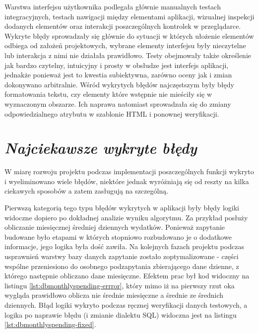 \documentclass[a4paper, 10pt, twoside, openright]{report}
\newcommand{\customstylesection}[1]{\textbf{\textit{#1}}}
\begin{document}
\begin{large}
\medskip
{Warstwa interfejsu użytkownika podlegała głównie manualnych testach 
integracyjnych, testach nawigacji między elementami aplikacji, wizualnej 
inspekcji dodanych elementów oraz interakcji poszczególnych kontrolek w 
przeglądarce. Wykryte błędy sprowadzały się głównie do sytuacji w których 
ułożenie elementów odbiega od założeń projektowych, wybrane elementy 
interfejsu były nieczytelne lub interakcja z nimi nie działała prawidłowo. Testy
 obejmowały także określenie jak bardzo czytelny, intuicyjny i prosty w obsłudze
 jest interfejs aplikacji, jednakże ponieważ jest to kwestia subiektywna, 
zarówno oceny jak i zmian dokonywano arbitralnie. Wśród wykrytych błędów 
najczęstszym były błędy formatowania tekstu, czy elementy które wstępnie nie 
mieściły się w wyznaczonym obszarze. Ich naprawa natomiast sprowadzała się do 
zmiany odpowiedzialnego atrybutu w szablonie HTML i ponownej weryfikacji.}

\section{\customstylesection{Najciekawsze wykryte błędy}}
{W miarę rozwoju projektu podczas implementacji poszczególnych funkcji wykryto i
 wyeliminowano wiele błędów, niektóre jednak wyróżniają się od reszty na kilka 
ciekawych sposobów a zatem zasługują na szczególną.}

{Pierwszą kategorią tego typu błędów wykrytych w aplikacji były błędy logiki 
widoczne dopiero po dokładnej analizie wyniku algorytmu. Za przykład posłuży 
obliczanie miesięcznej średniej dziennych wydatków. Ponieważ zapytanie budowane 
było etapami w których stopniowo rozbudowano je o dodatkowe informacje, jego 
logika była dość zawiła. Na kolejnych fazach projektu podczas usprawnień warstwy
 bazy danych zapytanie zostało zoptymalizowane - części wspólne przeniesiono do 
osobnego podzapytania zbierającego dane dzienne, z którego następnie obliczano 
dane miesięczne. Efektem prac był kod widoczny na listingu 
\ref{lst:dbmonthlyspending-errror}, który mimo iż na pierwszy rzut oka wygląda 
prawidłowo oblicza nie średnie miesięczne a średnie ze średnich dziennych. Błąd 
logiki wykryto podczas ręcznej weryfikacji danych testowych, a logika po 
naprawie błędu (i zmianie dialektu SQL) widoczna jest na listingu 
\ref{lst:dbmonthlyspending-fixed}.}


\end{large}
\end{document}
